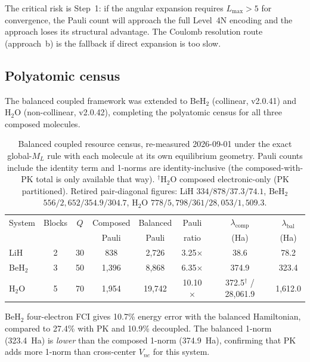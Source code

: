 \documentclass[aps,pra,twocolumn,superscriptaddress,longbibliography]{revtex4-2}
\begin{document}
The critical risk is Step~1: if the angular expansion requires
$L_{\max} > 5$ for convergence, the Pauli count will approach the
full Level~4N encoding and the approach loses its structural advantage.
The Coulomb resolution route (approach~b) is the fallback if direct
expansion is too slow.


\subsection{Polyatomic census}
\label{sec:polyatomic}

The balanced coupled framework was extended to BeH$_2$ (collinear,
v2.0.41) and H$_2$O (non-collinear, v2.0.42), completing the
polyatomic census for all three composed molecules.

\begin{table}[h]
\centering
\begin{tabular}{lccccccc}
\hline
System & Blocks & $Q$ & Composed & Balanced & Pauli & $\lambda_\text{comp}$ & $\lambda_\text{bal}$ \\
       &        &     & Pauli    & Pauli    & ratio & (Ha)                  & (Ha) \\
\hline
LiH    & 2 & 30 & 838   & 2,726 & 3.25$\times$ & 38.6  & 78.2  \\
BeH$_2$ & 3 & 50 & 1,396 & 8,868 & 6.35$\times$ & 374.9 & 323.4 \\
H$_2$O & 5 & 70 & 1,954 & 19,742 & 10.10$\times$ & 372.5$^\dagger$ / 28,061.9 & 1,612.0 \\
\hline
\end{tabular}
\caption{Balanced coupled resource census, re-measured 2026-09-01
under the exact global-$M_L$ rule with each molecule at its own
equilibrium geometry.  Pauli counts include the identity term and
1-norms are identity-inclusive (the composed-with-PK total is only
available that way).  $^\dagger$H$_2$O composed electronic-only (PK
partitioned).  Retired pair-diagonal figures: LiH $334/878/37.3/74.1$,
BeH$_2$ $556/2{,}652/354.9/304.7$, H$_2$O $778/5{,}798/361/28{,}053/1{,}509.3$.}
\label{tab:balanced_census}
\end{table}

BeH$_2$ four-electron FCI gives 10.7\% energy error with the
balanced Hamiltonian, compared to 27.4\% with PK and 10.9\%
decoupled.  The balanced 1-norm (323.4~Ha) is \emph{lower} than the
composed 1-norm (374.9~Ha), confirming that PK adds more 1-norm than
cross-center $V_{ne}$ for this system.
\end{document}
